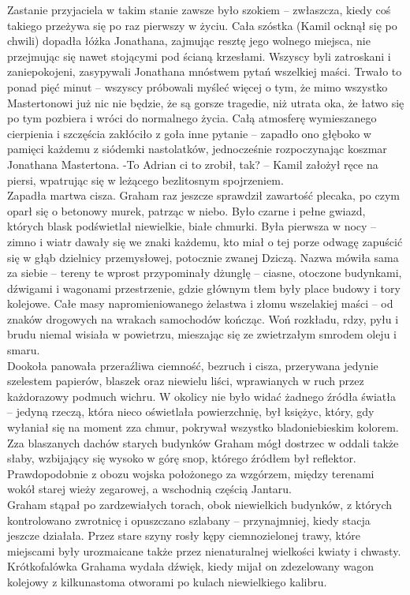 \documentclass[../MAIN.tex]{subfiles}
\begin{document}
Zastanie przyjaciela w takim stanie zawsze było szokiem -- zwłaszcza, kiedy coś takiego przeżywa się po raz pierwszy w życiu. Cała szóstka (Kamil ocknął się po chwili) dopadła łóżka Jonathana, zajmując resztę jego wolnego miejsca, nie przejmując się nawet stojącymi pod ścianą krzesłami. Wszyscy byli zatroskani i zaniepokojeni, zasypywali Jonathana mnóstwem pytań wszelkiej maści. Trwało to ponad pięć minut -- wszyscy próbowali myśleć więcej o tym, że mimo wszystko Mastertonowi już nic nie będzie, że są gorsze tragedie, niż utrata oka, że łatwo się po tym pozbiera i wróci do normalnego życia. Całą atmosferę wymieszanego cierpienia i szczęścia zakłóciło z goła inne pytanie -- zapadło ono głęboko w pamięci każdemu z siódemki nastolatków, jednocześnie rozpoczynając koszmar Jonathana Mastertona.
-To Adrian ci to zrobił, tak? -- Kamil założył ręce na piersi, wpatrując się w leżącego bezlitosnym spojrzeniem.\\
Zapadła martwa cisza.
% 
% 
Graham raz jeszcze sprawdził zawartość plecaka, po czym oparł się o betonowy murek, patrząc w niebo. Było czarne i pełne gwiazd, których blask podświetlał niewielkie, białe chmurki. Była pierwsza w nocy -- zimno i wiatr dawały się we znaki każdemu, kto miał o tej porze odwagę zapuścić się w głąb dzielnicy przemysłowej, potocznie zwanej Dziczą. Nazwa mówiła sama za siebie -- tereny te wprost przypominały dżunglę -- ciasne, otoczone budynkami, dźwigami i wagonami przestrzenie, gdzie głównym tłem były place budowy i tory kolejowe. Całe masy napromieniowanego żelastwa i złomu wszelakiej maści -- od znaków drogowych na wrakach samochodów kończąc. Woń rozkładu, rdzy, pyłu i brudu niemal wisiała w powietrzu, mieszając się ze zwietrzałym smrodem oleju i smaru.\\
Dookoła panowała przeraźliwa ciemność, bezruch i cisza, przerywana jedynie szelestem papierów, blaszek oraz niewielu liści, wprawianych w ruch przez każdorazowy podmuch wichru. W okolicy nie było widać żadnego źródła światła -- jedyną rzeczą, która nieco oświetlała powierzchnię, był księżyc, który, gdy wyłaniał się na moment zza chmur, pokrywał wszystko bladoniebieskim kolorem. Zza blaszanych dachów starych budynków Graham mógł dostrzec w oddali także słaby, wzbijający się wysoko w górę snop, którego źródłem był reflektor. Prawdopodobnie z obozu wojska położonego za wzgórzem, między terenami wokół starej wieży zegarowej, a wschodnią częścią Jantaru.\\
Graham stąpał po zardzewiałych torach, obok niewielkich budynków, z których kontrolowano zwrotnicę i opuszczano szlabany -- przynajmniej, kiedy stacja jeszcze działała. Przez stare szyny rosły kępy ciemnozielonej trawy, które miejscami były urozmaicane także przez nienaturalnej wielkości kwiaty i chwasty. Krótkofalówka Grahama wydała dźwięk, kiedy mijał on zdezelowany wagon kolejowy z kilkunastoma otworami po kulach niewielkiego kalibru.
\end{document}
